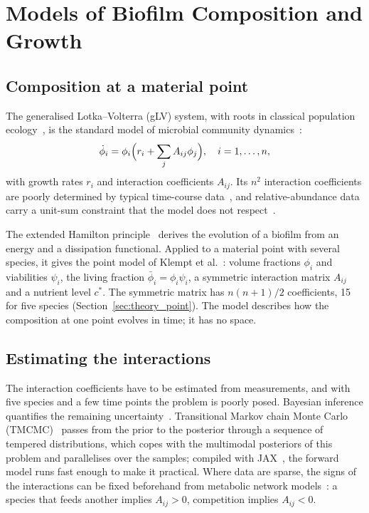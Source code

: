\section{Models of Biofilm Composition and Growth}
\label{sec:intro_models}

\subsection{Composition at a material point}

The generalised Lotka--Volterra (gLV) system, with roots in classical population ecology~\cite{Lotka1925Elements, May1972Stability}, is the standard model of microbial community dynamics~\cite{Gonze2018gLV, Stein2013gLV, Venturelli2018Deciphering, Marsland2019MicrobialCRM}:
\begin{equation}
  \dot{\phi}_i = \phi_i \Bigl( r_i + \sum_j A_{ij} \phi_j \Bigr), \quad i = 1,\dots,n,
  \label{eq:glv}
\end{equation}
with growth rates $r_i$ and interaction coefficients $A_{ij}$.
Its $n^2$ interaction coefficients are poorly determined by typical time-course data~\cite{Stein2013gLV, Cao2017Identifiability}, and relative-abundance data carry a unit-sum constraint that the model does not respect~\cite{Aitchison1986Compositional, Gloor2017Microbiome}.

The extended Hamilton principle~\cite{JunkerBalzani2021ExtendedHamilton} derives the evolution of a biofilm from an energy and a dissipation functional.
Applied to a material point with several species, it gives the point model of Klempt et al.~\cite{Klempt2026ContinuumBacterialGrowth}: volume fractions $\phi_i$ and viabilities $\psi_i$, the living fraction $\bar\phi_i=\phi_i\psi_i$, a symmetric interaction matrix $A_{ij}$ and a nutrient level $c^*$.
The symmetric matrix has $n(n+1)/2$ coefficients, 15 for five species (Section~\ref{sec:theory_point}).
The model describes how the composition at one point evolves in time; it has no space.

\subsection{Estimating the interactions}

The interaction coefficients have to be estimated from measurements, and with five species and a few time points the problem is poorly posed.
Bayesian inference quantifies the remaining uncertainty~\cite{Gelman2013BDA}.
Transitional Markov chain Monte Carlo (TMCMC)~\cite{ChingChen2007TMCMC, Betz2016TMCMC} passes from the prior to the posterior through a sequence of tempered distributions, which copes with the multimodal posteriors of this problem and parallelises over the samples; compiled with JAX~\cite{jax2018github}, the forward model runs fast enough to make it practical.
Where data are sparse, the signs of the interactions can be fixed beforehand from metabolic network models~\cite{OrthThiele2010WhatIsFBA, Diener2020MICOM, Heinken2023AGORA2}: a species that feeds another implies $A_{ij}>0$, competition implies $A_{ij}<0$.


